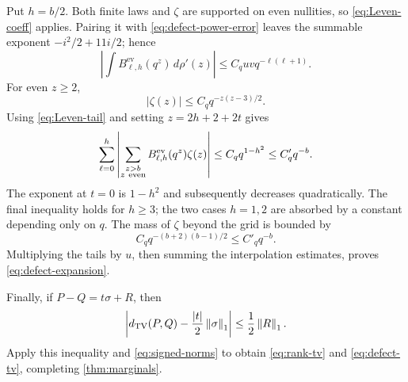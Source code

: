Put \(h=b/2\). Both finite laws and \(\zeta\) are supported on even
nullities, so \eqref{eq:Leven-coeff} applies. Pairing it with
\eqref{eq:defect-power-error} leaves the summable exponent
\(-i^2/2+11i/2\); hence
\[
 \left|\int B^{\mathrm{ev}}_{\ell,h}(q^z)\,d\rho'(z)\right|
    \le C_q uvq^{-\ell(\ell+1)}.
\]
For even \(z\ge2\),
\[
 |\zeta(z)|\le C_q q^{-z(z-3)/2}.
\]
Using \eqref{eq:Leven-tail} and setting \(z=2h+2+2t\) gives
\begin{equation}\label{eq:even-tail}
 \sum_{\ell=0}^h\left|
   \sum_{\substack{z>b\\z\ {\rm even}}}
        B^{\mathrm{ev}}_{\ell,h}(q^z)\zeta(z)\right|
     \le C_q q^{1-h^2}\le C'_q q^{-b}.
\end{equation}
The exponent at \(t=0\) is \(1-h^2\) and subsequently decreases
quadratically. The final inequality holds for \(h\ge3\);
the two cases \(h=1,2\) are absorbed by a constant depending only on \(q\).
The mass of \(\zeta\) beyond the grid is bounded by
\[
 C_q q^{-(b+2)(b-1)/2}\le C'_q q^{-b}.
\]
Multiplying the tails by \(u\), then summing the interpolation estimates,
proves \eqref{eq:defect-expansion}.

Finally, if \(P-Q=t\sigma+R\), then
\[
 \left|d_{\mathrm{TV}}(P,Q)-\frac{|t|}{2}\left\|\sigma\right\|_1\right|
       \le\frac12\left\|R\right\|_1.
\]
Apply this inequality and \eqref{eq:signed-norms} to obtain
\eqref{eq:rank-tv} and \eqref{eq:defect-tv}, completing
\cref{thm:marginals}.


